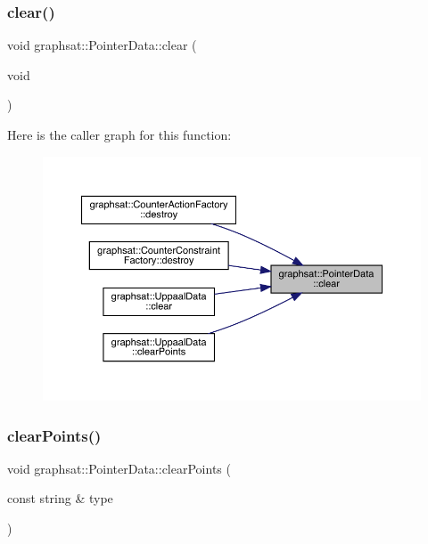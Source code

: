 \subsubsection{\texorpdfstring{clear()}{clear()}}
{\footnotesize\ttfamily void graphsat\+::\+Pointer\+Data\+::clear (\begin{DoxyParamCaption}\item[{void}]{ }\end{DoxyParamCaption})\hspace{0.3cm}{\ttfamily [inline]}}

Here is the caller graph for this function\+:\nopagebreak
\begin{figure}[H]
\begin{center}
\leavevmode
\includegraphics[width=350pt]{classgraphsat_1_1_pointer_data_ad550598884f265fc41845f2818070422_icgraph}
\end{center}
\end{figure}
\mbox{\label{classgraphsat_1_1_pointer_data_ac609e904c48f7cc8b136eb5208bd5ffe}} 
\subsubsection{\texorpdfstring{clearPoints()}{clearPoints()}\hspace{0.1cm}{\footnotesize\ttfamily [1/2]}}
{\footnotesize\ttfamily void graphsat\+::\+Pointer\+Data\+::clear\+Points (\begin{DoxyParamCaption}\item[{const string \&}]{type }\end{DoxyParamCaption})\hspace{0.3cm}{\ttfamily [inline]}}

